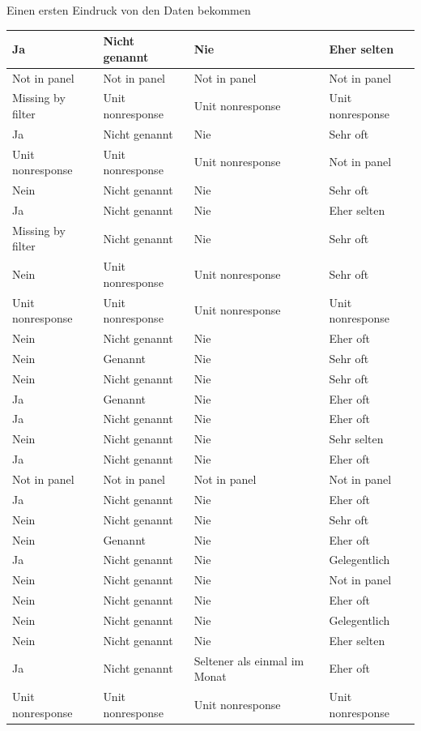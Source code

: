 \documentclass[ignorenonframetext,]{beamer}
\begin{document}
\begin{frame}{Einen ersten Eindruck von den Daten bekommen}
\begin{tabular}{l|l|l|l}
\hline
Ja & Nicht genannt & Nie & Eher selten\\
\hline
Not in panel & Not in panel & Not in panel & Not in panel\\
\hline
Missing by filter & Unit nonresponse & Unit nonresponse & Unit nonresponse\\
\hline
Ja & Nicht genannt & Nie & Sehr oft\\
\hline
Unit nonresponse & Unit nonresponse & Unit nonresponse & Not in panel\\
\hline
Nein & Nicht genannt & Nie & Sehr oft\\
\hline
Ja & Nicht genannt & Nie & Eher selten\\
\hline
Missing by filter & Nicht genannt & Nie & Sehr oft\\
\hline
Nein & Unit nonresponse & Unit nonresponse & Sehr oft\\
\hline
Unit nonresponse & Unit nonresponse & Unit nonresponse & Unit nonresponse\\
\hline
Nein & Nicht genannt & Nie & Eher oft\\
\hline
Nein & Genannt & Nie & Sehr oft\\
\hline
Nein & Nicht genannt & Nie & Sehr oft\\
\hline
Ja & Genannt & Nie & Eher oft\\
\hline
Ja & Nicht genannt & Nie & Eher oft\\
\hline
Nein & Nicht genannt & Nie & Sehr selten\\
\hline
Ja & Nicht genannt & Nie & Eher oft\\
\hline
Not in panel & Not in panel & Not in panel & Not in panel\\
\hline
Ja & Nicht genannt & Nie & Eher oft\\
\hline
Nein & Nicht genannt & Nie & Sehr oft\\
\hline
Nein & Genannt & Nie & Eher oft\\
\hline
Ja & Nicht genannt & Nie & Gelegentlich\\
\hline
Nein & Nicht genannt & Nie & Not in panel\\
\hline
Nein & Nicht genannt & Nie & Eher oft\\
\hline
Nein & Nicht genannt & Nie & Gelegentlich\\
\hline
Nein & Nicht genannt & Nie & Eher selten\\
\hline
Ja & Nicht genannt & Seltener als einmal im Monat & Eher oft\\
\hline
Unit nonresponse & Unit nonresponse & Unit nonresponse & Unit nonresponse\\

\end{tabular}
\end{frame}
\end{document}

